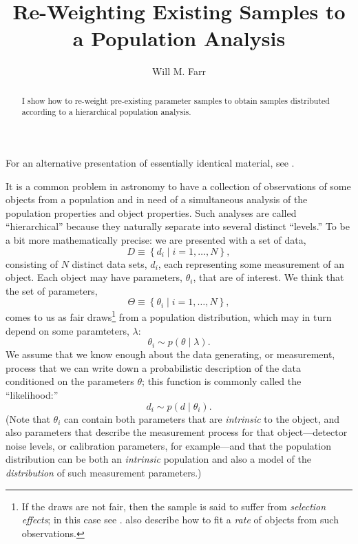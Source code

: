 \documentclass[modern]{aastex63}
\begin{document}
 
\title{Re-Weighting Existing Samples to a Population Analysis}
\author{Will M. Farr}

\begin{abstract} I show how to re-weight pre-existing parameter samples to
obtain samples distributed according to a hierarchical population analysis.
\end{abstract}

\section*{ }

For an alternative presentation of essentially identical material, see
\citet{Hogg2010}.

It is a common problem in astronomy to have a collection of observations of some
objects from a population and in need of a simultaneous analysis of the
population properties and object properties.  Such analyses are called
``hierarchical'' because they naturally separate into several distinct
``levels.''  To be a bit more mathematically precise: we are presented with a
set of data,
%
\begin{equation}
  D \equiv \left\{ d_i \mid i = 1, \ldots, N \right\},
\end{equation}
%
consisting of $N$ distinct data sets, $d_i$, each representing some measurement
of an object.  Each object may have parameters, $\theta_i$, that are of
interest.  We think that the set of parameters,
%
\begin{equation}
  \Theta \equiv \left\{ \theta_i \mid i = 1, \ldots, N \right\},
\end{equation}
%
comes to us as fair draws\footnote{If the draws are not fair, then the sample is
said to suffer from \emph{selection effects}; in this case see
\citet{Loredo2004,Messenger2013,Mandel2019}.  \citet{Loredo2004,Mandel2019} also
describe how to fit a \emph{rate} of objects from such observations.} from a
population distribution, which may in turn depend on some paramteters,
$\lambda$:
%
\begin{equation}
  \theta_i \sim p\left( \theta \mid \lambda \right).
\end{equation}
%
We assume that we know enough about the data generating, or measurement, process
that we can write down a probabilistic description of the data conditioned on
the parameters $\theta$; this function is commonly called the ``likelihood:''
%
\begin{equation}
  d_i \sim p\left( d \mid \theta_i \right).
\end{equation}
%
(Note that $\theta_i$ can contain both parameters that are \emph{intrinsic} to
the object, and also parameters that describe the measurement process for that
object---detector noise levels, or calibration parameters, for example---and
that the population distribution can be both an \emph{intrinsic} population and
also a model of the \emph{distribution} of such measurement parameters.)
\end{document}
